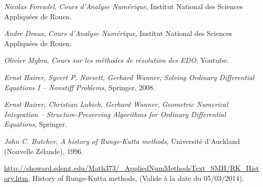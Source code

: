 \documentclass[a4paper, titlepage]{livret} %
\begin{document}
	\appendix
	
	\begin{thebibliography}{9}
	
			\emph{Nicolas Forcadel},
			\textit{Cours d'Analyse Numérique},
			Institut National des Sciences Appliquées de Rouen.

			\emph{Andre Draux},
			\textit{Cours d'Analyse Numérique},
			Institut National des Sciences Appliquées de Rouen.

			\emph{Olivier Mgbra},
			\textit{Cours sur les méthodes de résolution des EDO},
			Youtube.

			\emph{Ernst Hairer, Syvert P. N\o rsett, Gerhard Wanner},
			\textit{Solving Ordinary Differential Equations I – Nonstiff Problems},
			Springer, 2008.

			\emph{Ernst Hairer, Christian Lubich, Gerhard Wanner},
			\textit{Geometric Numerical Integration – Structure-Preserving Algorithms for Ordinary Differential Equations},
			Springer.
	
			\emph{John C. Butcher},
			\textit{A history of Runge-Kutta methods},
			Université d'Auckland (Nouvelle Zélande), 1996.

			\url{http://showard.sdsmt.edu/Math373/_AppliedNumMethodsText_SMH/RK_History.htm},
			History of Runge-Kutta methods,
			(Valide à la date du 05/03/2014).
	
	\end{thebibliography}
\end{document}
